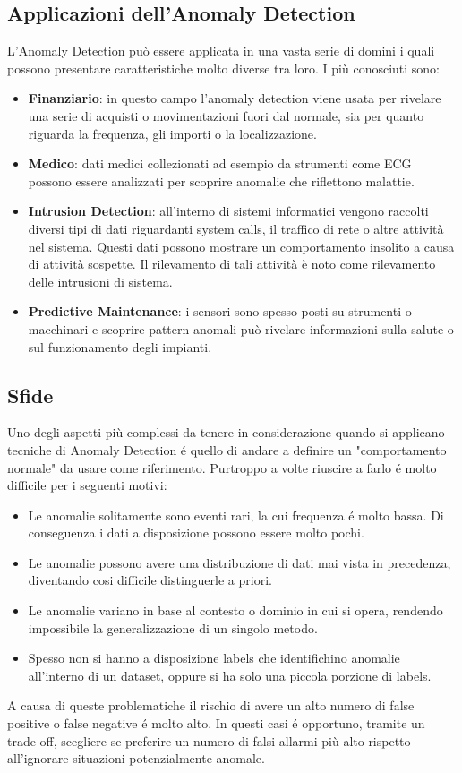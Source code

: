 \subsection{Applicazioni dell'Anomaly Detection}
L'Anomaly Detection può essere applicata in una vasta serie di domini i quali possono presentare caratteristiche molto diverse tra loro. I più conosciuti sono:
\begin{itemize}
  \item \textbf{Finanziario}: in questo campo l'anomaly detection viene usata per rivelare una serie di acquisti o movimentazioni fuori dal normale, sia per quanto riguarda la frequenza, gli importi o la localizzazione.
  \item \textbf{Medico}: dati medici collezionati ad esempio da strumenti come ECG possono essere analizzati per scoprire anomalie che riflettono malattie.
  \item \textbf{Intrusion Detection}: all'interno di sistemi informatici vengono raccolti diversi tipi di dati riguardanti system calls, il traffico di rete o altre attività nel sistema. Questi dati possono mostrare un comportamento insolito a causa di attività sospette. Il rilevamento di tali attività è noto come rilevamento delle intrusioni di sistema.
  \item \textbf{Predictive Maintenance}: i sensori sono spesso posti su strumenti o macchinari e scoprire pattern anomali può rivelare informazioni sulla salute o sul funzionamento degli impianti.
\end{itemize}

\subsection{Sfide}
Uno degli aspetti più complessi da tenere in considerazione quando si applicano tecniche di Anomaly Detection é quello di andare a definire un "comportamento normale" da usare come riferimento. Purtroppo a volte riuscire a farlo é molto difficile per i seguenti motivi:
\begin{itemize}
  \item Le anomalie solitamente sono eventi rari, la cui frequenza é molto bassa. Di conseguenza i dati a disposizione possono essere molto pochi.
  \item Le anomalie possono avere una distribuzione di dati mai vista in precedenza, diventando cosi difficile distinguerle a priori.
  \item Le anomalie variano in base al contesto o dominio in cui si opera, rendendo impossibile la generalizzazione di un singolo metodo.
  \item Spesso non si hanno a disposizione labels che identifichino anomalie all'interno di un dataset, oppure si ha solo una piccola porzione di labels.
\end{itemize}
A causa di queste problematiche il rischio di avere un alto numero di false positive o false negative é molto alto. In questi casi é opportuno, tramite un trade-off, scegliere se preferire un numero di falsi allarmi più alto rispetto all'ignorare situazioni potenzialmente anomale.

